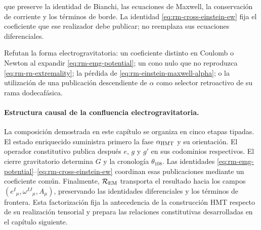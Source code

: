 que preserve la identidad de Bianchi, las ecuaciones de Maxwell, la
conservaci\'on de corriente y los t\'erminos de borde. La identidad
\eqref{eq:rm-cross-einstein-ew} fija el coeficiente que ese realizador debe
publicar; no reemplaza sus ecuaciones diferenciales.

\begin{falsifierbox}
Refutan la forma electrogravitatoria: un coeficiente distinto en Coulomb o
Newton al expandir \eqref{eq:rm-emg-potential}; un cono nulo que no reproduzca
\eqref{eq:rm-rn-extremality}; la p\'erdida de
\eqref{eq:rm-einstein-maxwell-alpha}; o la utilizaci\'on de una publicaci\'on
descendiente de \(\alpha\) como selector retroactivo de su rama dodecaf\'asica.
\end{falsifierbox}

\paragraph{Estructura causal de la confluencia electrogravitatoria.}
La composición demostrada en este capítulo se organiza en cinco etapas
tipadas. El estado enriquecido suministra primero la fase
\(\alpha_{\rm HMT}\) y su orientación. El operador constitutivo publica después
\(e\), \(g\) y \(g'\) en sus codominios respectivos. El cierre gravitatorio
determina \(G\) y la cronología \(\theta_{108}\). Las identidades
\eqref{eq:rm-emg-potential}--\eqref{eq:rm-cross-einstein-ew} coordinan esas
publicaciones mediante un coeficiente común. Finalmente,
\(\mathcal R_{\rm EM}\) transporta el resultado hacia los campos
\((e^I{}_{\mu},\omega^{IJ}{}_{\mu},A_\mu)\), preservando las identidades
diferenciales y los términos de frontera. Esta factorización fija la
antecedencia de la construcción HMT respecto de su realización tensorial y
prepara las relaciones constitutivas desarrolladas en el capítulo siguiente.
